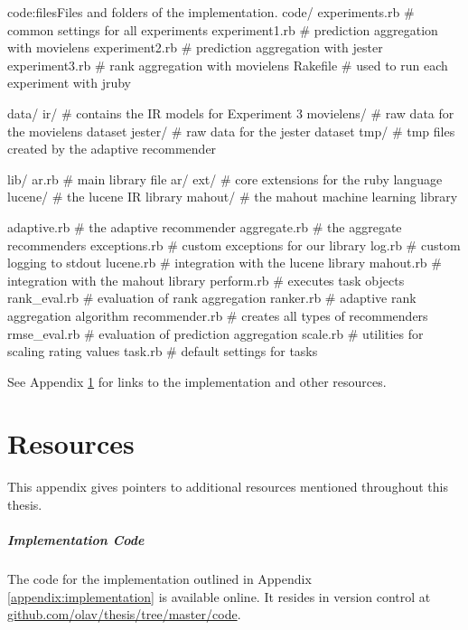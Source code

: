 \begin{implementation}{code:files}{Files and folders of the implementation.}
code/
  experiments.rb     # common settings for all experiments
  experiment1.rb     # prediction aggregation with movielens
  experiment2.rb     # prediction aggregation with jester
  experiment3.rb     # rank aggregation with movielens
  Rakefile           # used to run each experiment with jruby

  data/
    ir/              # contains the IR models for Experiment 3
    movielens/       # raw data for the movielens dataset
    jester/          # raw data for the jester dataset
    tmp/             # tmp files created by the adaptive recommender

  lib/
    ar.rb            # main library file
    ar/
      ext/           # core extensions for the ruby language
      lucene/        # the lucene IR library
      mahout/        # the mahout machine learning library

      adaptive.rb    # the adaptive recommender
      aggregate.rb   # the aggregate recommenders
      exceptions.rb  # custom exceptions for our library
      log.rb         # custom logging to stdout
      lucene.rb      # integration with the lucene library
      mahout.rb      # integration with the mahout library
      perform.rb     # executes task objects
      rank_eval.rb   # evaluation of rank aggregation
      ranker.rb      # adaptive rank aggregation algorithm
      recommender.rb # creates all types of recommenders
      rmse_eval.rb   # evaluation of prediction aggregation
      scale.rb       # utilities for scaling rating values
      task.rb        # default settings for tasks
\end{implementation}

\vspace{1em}
\noindent
See Appendix \ref{appendix:resources} for links to the implementation
and other resources.


\chapter{Resources}
\label{appendix:resources}

This appendix gives pointers to additional resources mentioned throughout this thesis.

\paragraph{Implementation Code}
The code for the implementation outlined in Appendix \ref{appendix:implementation} is available online.
It resides in version control at 
\url{github.com/olav/thesis/tree/master/code}.

